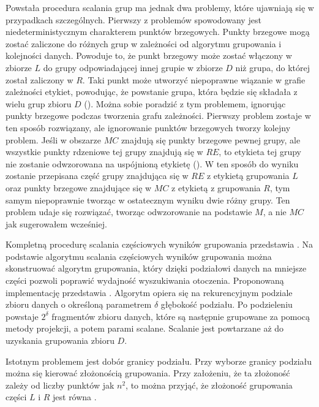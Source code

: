 Powstała procedura scalania grup ma jednak dwa problemy, które ujawniają się w przypadkach szczególnych. Pierwszy z problemów spowodowany jest niedeterministycznym charakterem punktów brzegowych. Punkty brzegowe mogą zostać zaliczone do różnych grup w zależności od algorytmu grupowania i kolejności danych. Powoduje to, że punkt brzegowy może zostać włączony w zbiorze $ L $ do grupy odpowiadającej innej grupie w zbiorze $ D $ niż grupa, do której został zaliczony w $ R $. Taki punkt może utworzyć niepoprawne wiązanie w grafie zależności etykiet, powodując, że powstanie grupa, która będzie się składała z wielu grup zbioru $ D $ (). Można sobie poradzić z tym problemem, ignorując punkty brzegowe podczas tworzenia grafu zależności. Pierwszy problem zostaje w ten sposób rozwiązany, ale ignorowanie punktów brzegowych tworzy kolejny problem. Jeśli w obszarze $ MC $ znajdują się punkty brzegowe pewnej grupy, ale wszystkie punkty rdzeniowe tej grupy znajdują się w $ RE $, to etykieta tej grupy nie zostanie odwzorowana na uspójnioną etykietę (). W ten sposób do wyniku zostanie przepisana część grupy znajdująca się w $ RE $ z etykietą grupowania $ L $ oraz punkty brzegowe znajdujące się w $ MC $ z etykietą z grupowania $ R $, tym samym niepoprawnie tworząc w ostatecznym wyniku dwie różny grupy. Ten problem udaje się rozwiązać, tworząc odwzorowanie na podstawie $ M $, a nie $ MC $ jak sugerowałem wcześniej.\par


Kompletną procedurę scalania częściowych wyników grupowania przedstawia . Na podstawie algorytmu scalania częściowych wyników grupowania można skonstruować algorytm grupowania, który dzięki podziałowi danych na mniejsze części pozwoli poprawić wydajność wyszukiwania otoczenia. Proponowaną implementację przedstawia . Algorytm opiera się na rekurencyjnym podziale zbioru danych o określoną parametrem $ \delta $ głębokość podziału. Po podzieleniu powstaje $ 2^\delta $ fragmentów zbioru danych, które są następnie grupowane za pomocą metody projekcji, a potem parami scalane. Scalanie jest powtarzane aż do uzyskania grupowania zbioru $ D $.\par

Istotnym problemem jest dobór granicy podziału. Przy wyborze granicy podziału można się kierować złożonością grupowania. Przy założeniu, że ta złożoność zależy od liczby punktów jak $ n^2 $, to można przyjąć, że złożoność grupowania części $ L $ i $ R $ jest równa .
